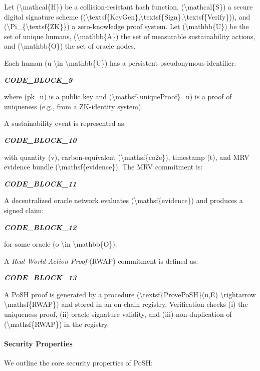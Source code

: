 \documentclass{article}
\begin{document}
Let ({\textbackslash}mathcal\{H\}) be a collision-resistant hash function, ({\textbackslash}mathcal\{S\}) a
secure digital signature scheme (({\textbackslash}textsf\{KeyGen\},{\textbackslash}textsf\{Sign\},{\textbackslash}textsf\{Verify\})),
and ({\textbackslash}Pi\_\{{\textbackslash}textsf\{ZK\}\}) a zero-knowledge proof system. Let ({\textbackslash}mathbb\{U\}) be
the set of unique humans, ({\textbackslash}mathbb\{A\}) the set of measurable sustainability
actions, and ({\textbackslash}mathbb\{O\}) the set of oracle nodes.

Each human (u {\textbackslash}in {\textbackslash}mathbb\{U\}) has a persistent pseudonymous identifier:

\textit{\textbf{CODE\_BLOCK\_9}}

where (pk\_u) is a public key and ({\textbackslash}mathsf\{uniqueProof\}\_u) is a proof of
uniqueness (e.g., from a ZK-identity system).

A sustainability event is represented as:

\textit{\textbf{CODE\_BLOCK\_10}}

with quantity (v), carbon-equivalent ({\textbackslash}mathsf\{co2e\}), timestamp (t), and
MRV evidence bundle ({\textbackslash}mathsf\{evidence\}). The MRV commitment is:

\textit{\textbf{CODE\_BLOCK\_11}}

A decentralized oracle network evaluates ({\textbackslash}mathsf\{evidence\}) and produces a
signed claim:

\textit{\textbf{CODE\_BLOCK\_12}}

for some oracle (o {\textbackslash}in {\textbackslash}mathbb\{O\}).

A \textit{Real-World Action Proof} (RWAP) commitment is defined as:

\textit{\textbf{CODE\_BLOCK\_13}}

A PoSH proof is generated by a procedure
({\textbackslash}textsf\{ProvePoSH\}(u,E) {\textbackslash}rightarrow {\textbackslash}mathsf\{RWAP\}) and stored in an on-chain
registry. Verification checks (i) the uniqueness proof, (ii) oracle signature
validity, and (iii) non-duplication of ({\textbackslash}mathsf\{RWAP\}) in the registry.

\paragraph{Security Properties}

We outline the core security properties of PoSH:
\end{document}
